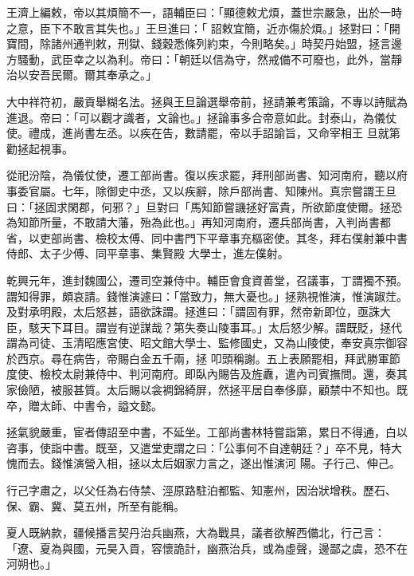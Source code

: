 \begin{pinyinscope}
 王濟上編敕，帝以其煩簡不一，語輔臣曰：「顯德敕尤煩，蓋世宗嚴急，出於一時之意，臣下不敢言其失也。」王旦進曰：「
 詔敕宜簡，近亦傷於煩。」拯對曰：「開寶間，除諸州通判敕，刑獄、錢穀悉條列約束，今則略矣。」時契丹始盟，拯言邊方騷動，武臣幸之以為利。帝曰：「朝廷以信為守，然戒備不可廢也，此外，當靜治以安吾民爾。爾其奉承之。」



 大中祥符初，嚴貢舉糊名法。拯與王旦論選舉帝前，拯請兼考策論，不專以詩賦為進退。帝曰：「可以觀才識者，文論也。」拯論事多合帝意如此。封泰山，為儀仗使。禮成，進尚書左丞。以疾在告，數請罷，帝以手詔諭旨，又命宰相王
 旦就第勸拯起視事。



 從祀汾陰，為儀仗使，遷工部尚書。復以疾求罷，拜刑部尚書、知河南府，聽以府事委官屬。七年，除御史中丞，又以疾辭，除戶部尚書、知陳州。真宗嘗謂王旦曰：「拯固求閑郡，何邪？」旦對曰「馬知節嘗譏拯好富貴，所欲節度使爾。拯恐為知節所量，不敢請大藩，殆為此也。」再知河南府，遷兵部尚書，入判尚書都省，以吏部尚書、檢校太傅、同中書門下平章事充樞密使。其冬，拜右僕射兼中書侍郎、太子少傅、同平章事、集賢殿
 大學士，進左僕射。



 乾興元年，進封魏國公，遷司空兼侍中。輔臣會食資善堂，召議事，丁謂獨不預。謂知得罪，頗哀請。錢惟演遽曰：「當致力，無大憂也。」拯熟視惟演，惟演踧茳。及對承明殿，太后怒甚，語欲誅謂。拯進曰：「謂固有罪，然帝新即位，亟誅大臣，駭天下耳目。謂豈有逆謀哉？第失奏山陵事耳。」太后怒少解。謂既貶，拯代謂為司徒、玉清昭應宮使、昭文館大學士、監修國史，又為山陵使，奉安真宗御容於西京。尋在病告，帝賜白金五千兩，拯
 叩頭稱謝。五上表願罷相，拜武勝軍節度使、檢校太尉兼侍中、判河南府。即臥內賜告及旌纛，遣內司賓撫問。還，奏其家儉陋，被服甚質。太后賜以衾裯錦綺屏，然拯平居自奉侈靡，顧禁中不知也。既卒，贈太師、中書令，謚文懿。



 拯氣貌嚴重，宦者傳詔至中書，不延坐。工部尚書林特嘗詣第，累日不得通，白以咨事，使詣中書。既至，又遣堂吏謂之曰：「公事何不自達朝廷？」卒不見，特大愧而去。錢惟演營入相，拯以太后姻家力言之，遂出惟演河
 陽。子行己、伸己。



 行己字肅之，以父任為右侍禁、涇原路駐泊都監、知憲州，因治狀增秩。歷石、保、霸、冀、莫五州，所至有能稱。



 夏人既納款，疆候播言契丹治兵幽燕，大為戰具，議者欲解西備北，行己言：「遼、夏為與國，元昊入貢，容懷詭計，幽燕治兵，或為虛聲，邊鄙之虞，恐不在河朔也。」




\end{pinyinscope}
